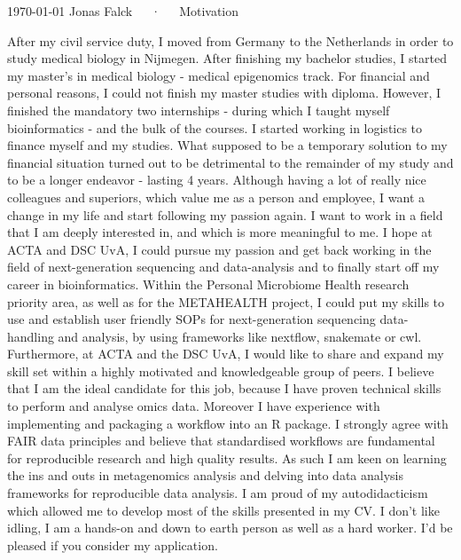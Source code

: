 \documentclass[11pt, a4paper]{awesome-cv}
\begin{document}
\makecvheader[R]

\makecvfooter
  {\today}
  {Jonas Falck~~~·~~~Motivation}
  {}

\makelettertitle

\begin{cvletter}

After my civil service duty, I moved from Germany to the Netherlands in order to study medical biology in Nijmegen. 
After finishing my bachelor studies, I started my master's in medical biology - medical epigenomics track.
For financial and personal reasons, I could not finish my master studies with diploma.
However, I finished the mandatory two internships - during which I taught myself bioinformatics - and the bulk of the courses.
I started working in logistics to finance myself and my studies.
What supposed to be a temporary solution to my financial situation turned out to be detrimental to the remainder of my study and to be a longer endeavor - lasting 4 years.
Although having a lot of really nice colleagues and superiors, which value me as a person and employee, I want a change in my life and start following my passion again.
I want to work in a field that I am deeply interested in, and which is more meaningful to me.
I hope at ACTA and DSC UvA, I could pursue my passion and get back working in the field of next-generation sequencing and data-analysis and to finally start off my career in bioinformatics.
Within the Personal Microbiome Health research priority area, as well as for the METAHEALTH project, I could put my skills to use and establish user friendly SOPs for next-generation sequencing data-handling and analysis, by using frameworks like nextflow, snakemate or cwl.
Furthermore, at ACTA and the DSC UvA, I would like to share and expand my skill set within a highly motivated and knowledgeable group of peers.
I believe that I am the ideal candidate for this job, because I have proven technical skills to perform and analyse omics data.
Moreover I have experience with implementing and packaging a workflow into an R package.
I strongly agree with FAIR data principles and believe that standardised workflows are fundamental for reproducible research and high quality results.
As such I am keen on learning the ins and outs in metagenomics analysis and delving into data analysis frameworks for reproducible data analysis.
I am proud of my autodidacticism which allowed me to develop most of the skills presented in my CV.
I don't like idling, I am a hands-on and down to earth person as well as a hard worker.
I'd be pleased if you consider my application.
\end{cvletter}


\makeletterclosing
\end{document}

